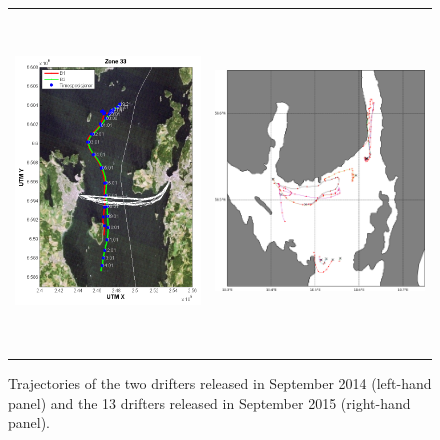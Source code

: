 \begin{figure}[htb]
  \begin{center}
    \begin{tabular}{cc}
      \includegraphics*[height=9cm]{Figurer/drifters_sept2014} & 
      \includegraphics*[height=8cm]{Figurer/drifters_low_crop} \\ 
    \end{tabular}
    \caption{\small Trajectories of the two drifters released in September 2014 (left-hand panel) and the 13 drifters released in September 2015 (right-hand panel).}
    \label{fig:drifters_tracks}
  \end{center}
\end{figure}

